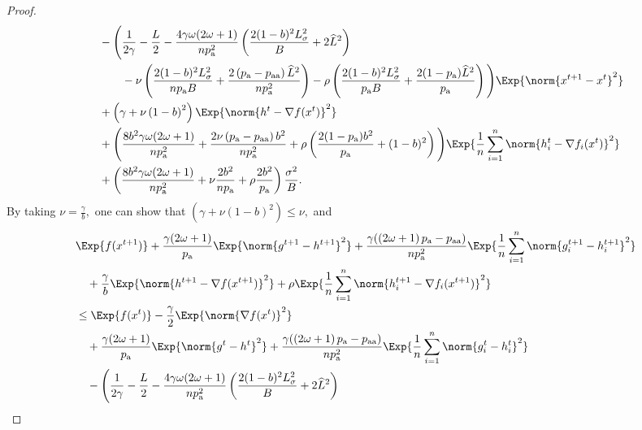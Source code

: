 \documentclass{article}
\newcommand*{\probavailable}{\ensuremath{p_{\textnormal{a}}}}
\newcommand*{\probpairaa}{\ensuremath{p_{\textnormal{aa}}}}
\begin{document}
\begin{proof}
\begin{align*}
      &\quad - \Bigg(\frac{1}{2\gamma} - \frac{L}{2} - \frac{4 \gamma \omega (2 \omega + 1)}{n \probavailable^2} \left(\frac{2 (1 - b)^2 L_{\sigma}^2}{B} + 2 \widehat{L}^2\right) \\
      &\qquad\quad - \nu\left(\frac{2 (1 - b)^2 L_{\sigma}^2}{n \probavailable B} + \frac{2\left(\probavailable - \probpairaa\right) \widehat{L}^2}{n \probavailable^2} \right) - \rho \left(\frac{2 (1 - b)^2 L_{\sigma}^2}{\probavailable B} + \frac{2(1 - \probavailable) \widehat{L}^2}{\probavailable}\right)\Bigg) \Exp{\norm{x^{t+1} - x^t}^2} \\
      &\quad + \left(\gamma + \nu \left(1 - b\right)^2\right) \Exp{\norm{h^{t} - \nabla f(x^{t})}^2} \\
      &\quad + \Bigg(\frac{8 b^2 \gamma \omega (2 \omega + 1)}{n \probavailable^2} + \frac{2 \nu \left(\probavailable - \probpairaa\right) b^2}{n \probavailable^2} + \rho \left(\frac{2 (1 - \probavailable) b^2}{\probavailable} + (1 - b)^2\right)\Bigg)\Exp{\frac{1}{n}\sum_{i=1}^n\norm{h^{t}_i - \nabla f_i(x^{t})}^2} \\
      &\quad + \left(\frac{8 b^2 \gamma \omega (2 \omega + 1)}{n \probavailable^2} + \nu \frac{2 b^2}{n \probavailable} + \rho \frac{2 b^2}{\probavailable}\right) \frac{\sigma^2}{B}.
    \end{align*}
    By taking $\nu = \frac{\gamma}{b},$ one can show that $\left(\gamma + \nu (1 - b)^2\right) \leq \nu,$ and
    \begin{align*}
      &\Exp{f(x^{t + 1})} + \frac{\gamma (2 \omega + 1)}{\probavailable} \Exp{\norm{g^{t+1} - h^{t+1}}^2} + \frac{\gamma (\left(2 \omega + 1\right)\probavailable - \probpairaa)}{n \probavailable^2} \Exp{\frac{1}{n}\sum_{i=1}^n\norm{g^{t+1}_i - h^{t+1}_i}^2}\\
      &\quad  + \frac{\gamma}{b} \Exp{\norm{h^{t+1} - \nabla f(x^{t+1})}^2} + \rho \Exp{\frac{1}{n}\sum_{i=1}^n\norm{h^{t+1}_i - \nabla f_i(x^{t+1})}^2}\\
      &\leq \Exp{f(x^t)} - \frac{\gamma}{2}\Exp{\norm{\nabla f(x^t)}^2} \\
      &\quad + \frac{\gamma (2 \omega + 1)}{\probavailable} \Exp{\norm{g^{t} - h^{t}}^2} + \frac{\gamma (\left(2 \omega + 1\right)\probavailable - \probpairaa)}{n \probavailable^2} \Exp{\frac{1}{n}\sum_{i=1}^n\norm{g^{t}_i - h^{t}_i}^2} \\
      &\quad - \Bigg(\frac{1}{2\gamma} - \frac{L}{2} - \frac{4 \gamma \omega (2 \omega + 1)}{n \probavailable^2} \left(\frac{2 (1 - b)^2 L_{\sigma}^2}{B} + 2 \widehat{L}^2\right) \\

\end{align*}
\end{proof}
\end{document}
